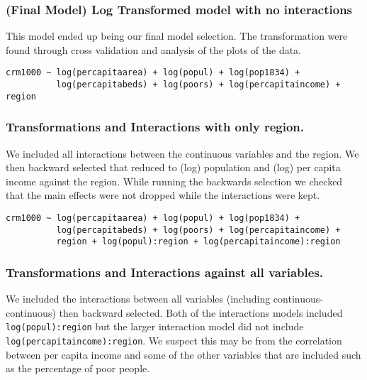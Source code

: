 \documentclass[]{article}
\begin{document}
\subsubsection{(Final Model) Log Transformed model with no
interactions}\label{final-model-log-transformed-model-with-no-interactions}

This model ended up being our final model selection. The transformation
were found through cross validation and analysis of the plots of the
data.

\begin{verbatim}
crm1000 ~ log(percapitaarea) + log(popul) + log(pop1834) +
          log(percapitabeds) + log(poors) + log(percapitaincome) + region
\end{verbatim}

\subsubsection{Transformations and Interactions with only
region.}\label{transformations-and-interactions-with-only-region.}

We included all interactions between the continuous variables and the
region. We then backward selected that reduced to (log) population and
(log) per capita income against the region. While running the backwards
selection we checked that the main effects were not dropped while the
interactions were kept.

\begin{verbatim}
crm1000 ~ log(percapitaarea) + log(popul) + log(pop1834) +
          log(percapitabeds) + log(poors) + log(percapitaincome) +
          region + log(popul):region + log(percapitaincome):region
\end{verbatim}

\subsubsection{Transformations and Interactions against all
variables.}\label{transformations-and-interactions-against-all-variables.}

We included the interactions between all variables (including
continuous-continuous) then backward selected. Both of the interactions
models included \texttt{log(popul):region} but the larger interaction
model did not include \texttt{log(percapitaincome):region}. We suspect
this may be from the correlation between per capita income and some of
the other variables that are included such as the percentage of poor
people.
\end{document}
